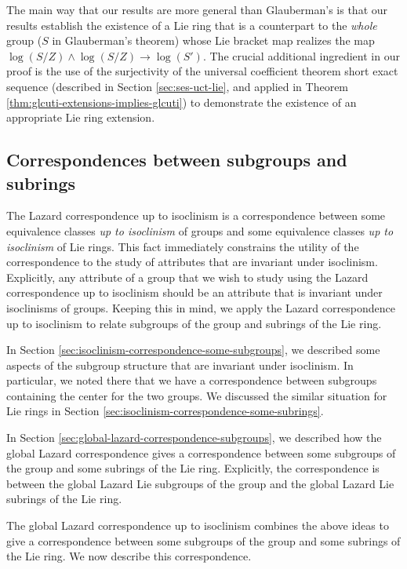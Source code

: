 The main way that our results are more general than Glauberman's is
that our results establish the existence of a Lie ring that is a
counterpart to the {\em whole} group ($S$ in Glauberman's theorem)
whose Lie bracket map realizes the map $\log(S/Z) \wedge \log (S/Z)
\to \log(S')$. The crucial additional ingredient in our proof is the
use of the surjectivity of the universal coefficient theorem short
exact sequence (described in Section \ref{sec:ses-uct-lie}, and
applied in Theorem \ref{thm:glcuti-extensions-implies-glcuti}) to
demonstrate the existence of an appropriate Lie ring extension.

\subsection{Correspondences between subgroups and subrings}\label{sec:lcuti-sub}

The Lazard correspondence up to isoclinism is a correspondence between
some equivalence classes {\em up to isoclinism} of groups and some
equivalence classes {\em up to isoclinism} of Lie rings. This fact
immediately constrains the utility of the correspondence to the study
of attributes that are invariant under isoclinism. Explicitly, any
attribute of a group that we wish to study using the Lazard
correspondence up to isoclinism should be an attribute that is
invariant under isoclinisms of groups. Keeping this in mind, we apply
the Lazard correspondence up to isoclinism to relate subgroups of the
group and subrings of the Lie ring.

In Section \ref{sec:isoclinism-correspondence-some-subgroups}, we
described some aspects of the subgroup structure that are invariant
under isoclinism. In particular, we noted there that we have a
correspondence between subgroups containing the center for the two
groups. We discussed the similar situation for Lie rings in Section
\ref{sec:isoclinism-correspondence-some-subrings}.

In Section \ref{sec:global-lazard-correspondence-subgroups}, we
described how the global Lazard correspondence gives a correspondence
between some subgroups of the group and some subrings of the Lie
ring. Explicitly, the correspondence is between the global Lazard Lie
subgroups of the group and the global Lazard Lie subrings of the Lie
ring.

The global Lazard correspondence up to isoclinism combines the above
ideas to give a correspondence between some subgroups of the group and
some subrings of the Lie ring. We now describe this correspondence.

